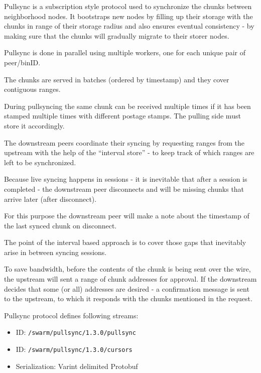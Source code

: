         
Pullsync is a subscription style protocol used to synchronize the chunks
between neighborhood nodes. It bootstraps new nodes by filling up their
storage with the chunks in range of their storage radius and also
ensures eventual consistency - by making sure that the chunks will
gradually migrate to their storer nodes.

Pullsync is done in parallel using multiple workers, one for each unique
pair of peer/binID.

The chunks are served in batches (ordered by timestamp) and they cover
contiguous ranges.

During pullsyncing the same chunk can be received multiple times if it has 
been stamped multiple times with different postage stamps.
The pulling side must store it accordingly.

The downstream peers coordinate their syncing by requesting ranges from
the upstream with the help of the ``interval store'' - to keep track of
which ranges are left to be synchronized.

Because live syncing happens in sessions - it is inevitable that after a
session is completed - the downstream peer disconnects and will be
missing chunks that arrive later (after disconnect).

For this purpose the downstream peer will make a note about the
timestamp of the last synced chunk on disconnect.

The point of the interval based approach is to cover those gaps that
inevitably arise in between syncing sessions.

To save bandwidth, before the contents of the chunk is being sent over
the wire, the upstream will sent a range of chunk addresses for
approval. If the downstream decides that some (or all) addresses are
desired - a confirmation message is sent to the upstream, to which it
responds with the chunks mentioned in the request.

Pullsync protocol defines following streams:
\begin{itemize}
    \item ID: \texttt{/swarm/pullsync/1.3.0/pullsync}
    \item ID: \texttt{/swarm/pullsync/1.3.0/cursors}
    \item Serialization: Varint delimited Protobuf
\end{itemize}

